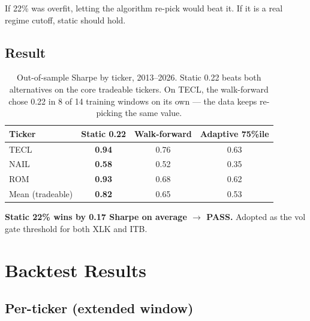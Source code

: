 \documentclass[11pt,a4paper]{article}
\begin{document}
If 22\% was overfit, letting the algorithm re-pick would beat it. If it is a real regime cutoff, static should hold.

\subsection{Result}

\begin{table}[H]
\centering
\small
\renewcommand{\arraystretch}{1.15}
\begin{tabular}{lccc}
\toprule
\textbf{Ticker} & \textbf{Static 0.22} & \textbf{Walk-forward} & \textbf{Adaptive 75\%ile} \\
\midrule
TECL   & \textbf{0.94} & 0.76 & 0.63 \\
NAIL   & \textbf{0.58} & 0.52 & 0.35 \\
ROM    & \textbf{0.93} & 0.68 & 0.62 \\
Mean (tradeable) & \textbf{0.82} & 0.65 & 0.53 \\
\bottomrule
\end{tabular}
\caption{Out-of-sample Sharpe by ticker, 2013--2026. Static 0.22 beats both alternatives on the core tradeable tickers. On TECL, the walk-forward chose 0.22 in 8 of 14 training windows on its own --- the data keeps re-picking the same value.}
\end{table}

\textbf{Static 22\% wins by 0.17 Sharpe on average $\to$ PASS.} Adopted as the vol gate threshold for both XLK and ITB.

\section{Backtest Results}

\subsection{Per-ticker (extended window)}
\end{document}
